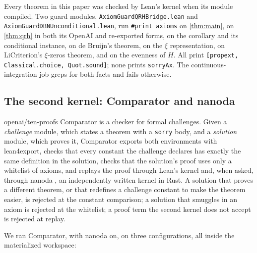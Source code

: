 \documentclass[11pt]{article}
\theoremstyle{definition}
\newcommand{\lean}[1]{\texttt{#1}}
\newcommand{\Hfun}{H}
\begin{document}
Every theorem in this paper was checked by Lean's kernel when its module compiled. Two guard modules, \lean{AxiomGuardQRHBridge.lean} and \lean{AxiomGuardDBNUnconditional.lean}, run \lean{\#print axioms} on \cref{thm:main}, on \cref{thm:qrh} in both its OpenAI and re-exported forms, on the corollary and its conditional instance, on de Bruijn's theorem, on the $\xi$ representation, on LiCriterion's $\xi$-zeros theorem, and on the evenness of $\Hfun$. All print \lean{[propext, Classical.choice, Quot.sound]}; none prints \lean{sorryAx}. The continuous-integration job greps for both facts and fails otherwise.

\subsection{The second kernel: Comparator and nanoda}

openai/ten-proofs Comparator \cite{Comparator} is a checker for formal challenges. Given a \emph{challenge} module, which states a theorem with a \lean{sorry} body, and a \emph{solution} module, which proves it, Comparator exports both environments with lean4export, checks that every constant the challenge declares has exactly the same definition in the solution, checks that the solution's proof uses only a whitelist of axioms, and replays the proof through Lean's kernel and, when asked, through nanoda \cite{nanoda}, an independently written kernel in Rust. A solution that proves a different theorem, or that redefines a challenge constant to make the theorem easier, is rejected at the constant comparison; a solution that smuggles in an axiom is rejected at the whitelist; a proof term the second kernel does not accept is rejected at replay.

We ran Comparator, with nanoda on, on three configurations, all inside the materialized workspace:
\end{document}

